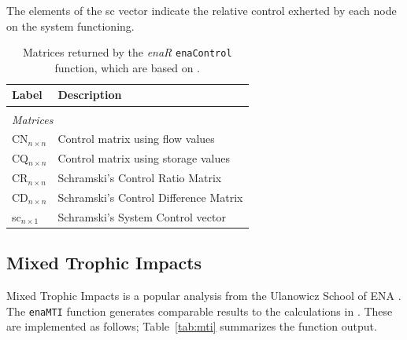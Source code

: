 \documentclass[article]{jss}
\begin{document}
The elements of the sc vector indicate the relative control exherted by each node on the system functioning.

\begin{table}[t]
  \caption{Matrices returned by the \textit{enaR}
    \texttt{enaControl} function, which are based on
    \citep{dame81, patten81, schramski06, schramski07}.} \label{tab:control}
  \center
  \begin{small}
    \begin{tabular}{l p{10 cm}}
      \textbf{Label} & \textbf{Description} \\ \hline \\[-1.5ex]
      \multicolumn{2}{l}{\textit{Matrices}} \\[1ex]
      CN$_{n \times n}$ & Control matrix using flow values \\                       %
      CQ$_{n \times n}$ & Control matrix using storage values \\
      CR$_{n \times n}$ & Schramski's Control Ratio Matrix  \\            %
      CD$_{n \times n}$ & Schramski's Control Difference Matrix \\  %
      sc$_{n \times 1}$ & Schramski's System Control vector \\ \hline %
\end{tabular}
\end{small}
\end{table}


\subsection{Mixed Trophic Impacts}
Mixed Trophic Impacts is a popular analysis from the Ulanowicz School
of ENA \citep{ulanowicz90}.  The \texttt{enaMTI} function generates
comparable results to the calculations in \citet{ulanowicz90}.  These
are implemented as follows; Table~\ref{tab:mti} summarizes the
function output.
\end{document}

